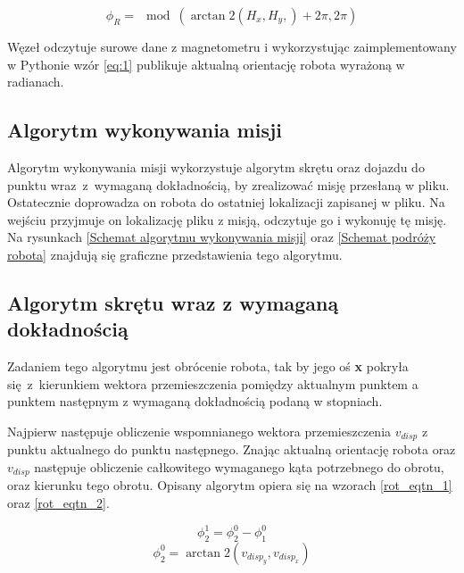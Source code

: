 {{{            \begin{equation}\label{eq:1}
                \phi_R=\mod(\arctan2(H_x,H_y,)+ 2\pi, 2\pi)
            \end{equation}

            Węzeł odczytuje surowe dane z magnetometru i wykorzystując zaimplementowany w Pythonie wzór \ref{eq:1} publikuje aktualną orientację robota wyrażoną w radianach.
        }
    }
    \subsection{Algorytm wykonywania misji}
    {
        Algorytm wykonywania misji wykorzystuje algorytm skrętu oraz dojazdu do punktu wraz~z~wymaganą dokładnością, by zrealizować misję przesłaną w pliku. Ostatecznie doprowadza on robota do ostatniej lokalizacji zapisanej w pliku. Na wejściu przyjmuje on lokalizację pliku z misją, odczytuje go i wykonuję tę misję.
        Na rysunkach \ref{Schemat algorytmu wykonywania misji} oraz \ref{Schemat podróży robota} znajdują się graficzne przedstawienia tego algorytmu.

    }
    \subsection{Algorytm skrętu wraz z wymaganą dokładnością}
    {
        \label{rot_algorithm}
        Zadaniem tego algorytmu jest obrócenie robota, tak by jego oś \textbf{x} pokryła się~z~kierunkiem wektora przemieszczenia pomiędzy aktualnym punktem a punktem następnym z wymaganą dokładnością podaną w stopniach.

        Najpierw następuje obliczenie wspomnianego wektora przemieszczenia $v_{disp}$ z punktu aktualnego do punktu następnego. Znając aktualną orientację robota oraz $v_{disp}$ następuje obliczenie całkowitego wymaganego kąta potrzebnego do obrotu, oraz kierunku tego obrotu. Opisany algorytm opiera się na wzorach \ref{rot_eqtn_1} oraz \ref{rot_eqtn_2}.


        \begin{equation}\label{rot_eqtn_1}
            \phi_2^1=\phi_{2}^{0} - \phi_1^0
        \end{equation}
        \begin{equation}\label{rot_eqtn_2}
            \phi_{2}^{0}=\arctan2(v_{disp_y},v_{disp_x})
        \end{equation}

}}
